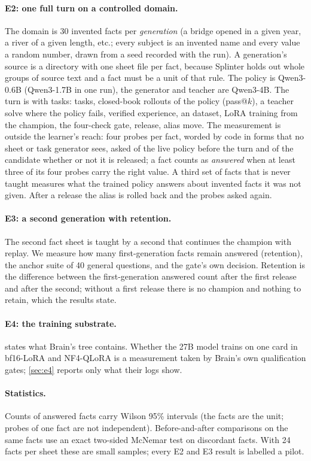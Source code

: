 \paragraph{E2: one full turn on a controlled domain.} The domain is 30 invented facts per
\emph{generation} (a bridge opened in a given year, a river of a given length, etc.; every
subject is an invented name and every value a random number, drawn from a seed recorded with
the run). A generation's source is a directory with one sheet file per fact, because Splinter
holds out whole groups of source text and a fact must be a unit of that rule. The policy is
Qwen3-0.6B (Qwen3-1.7B in one run), the generator and teacher are Qwen3-4B. The turn is
 with  tasks: tasks, closed-book rollouts of the policy
(pass@$k$), a teacher solve where the policy fails, verified experience, an 
dataset, LoRA training from the champion, the four-check gate, release, alias move. The
measurement is outside the learner's reach: four probes per fact, worded by code in forms that no
sheet or task generator sees, asked of the live policy  before the turn and
of the candidate whether or not it is released; a fact counts as \emph{answered} when at least
three of its four probes carry the right value. A third set of facts that is never taught
measures what the trained policy answers about invented facts it was not given. After a release
the alias is rolled back and the probes asked again.

\paragraph{E3: a second generation with retention.} The second fact sheet is taught by a
second  that continues the champion with replay. We measure how many
first-generation facts remain answered (retention), the anchor suite of 40 general
questions, and the gate's own decision. Retention is the difference between the
first-generation answered count after the first release and after the second; without a first
release there is no champion and nothing to retain, which the results state.

\paragraph{E4: the training substrate.}  states what Brain's tree
contains. Whether the 27B model trains on one card in bf16-LoRA and NF4-QLoRA is a
measurement taken by Brain's own qualification gates; \cref{sec:e4} reports only what
their logs show.

\paragraph{Statistics.} Counts of answered facts carry Wilson 95\% intervals (the facts
are the unit; probes of one fact are not independent). Before-and-after comparisons on the
same facts use an exact two-sided McNemar test on discordant facts. With 24 facts per
sheet these are small samples; every E2 and E3 result is labelled a pilot.
